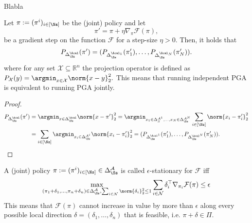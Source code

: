\begin{lemma}\label{lemma:smoothness} 
    Blabla
\end{lemma}

\begin{lemma}\label{claim:projection} Let $\pi := (\pi^i)_{i \in [\Ns]}$ be the (joint) policy and let
\begin{equation}
    \pi' = \pi + \eta \nabla_\pi\mathcal F(\pi),
\end{equation}
be a gradient step on the function $\mathcal F$ for a step-size $\eta>0$. Then, it holds that
\begin{equation}
    P_{\Delta^\Acal_\Ss} (\pi') = (P_{\Delta^{\Acal_1}_\Ss} (\pi'_1) , \dots , P_{\Delta^{\Acal_N}_\Ss}(\pi'_N)).
\end{equation}
where for any set $\mathcal{X}\subseteq \mathbb R^n$ the projection operator is defined as $P_{\mathcal{X}}(y) = \argmin_{x \in\mathcal{X}}  \norm{x-y}_2^2.$ This means that running independent PGA is equivalent to running PGA jointly.
\end{lemma}

\begin{proof}
    \begin{align*}
    P_{\Delta^\Acal_\Ss} (\pi') &= \argmin_{x \in \Delta^\Acal_\Ss}  \norm{x-\pi'}_2^2= \argmin_{x_1 \in \Delta^{\mathcal{A}^1}_S,...,x_N \in 
    \Delta^{\mathcal{A}^N}_\Ss} \sum_{i\in [\Ns]}\norm{x_i - \pi'_i}_2^2\\
    &= \sum_{i \in [\Ns]} \argmin_{x_i \in \Delta^{\mathcal{A}^i}_\Ss} \norm{x_i - \pi'_i}_2^2= (P_{\Delta^{\Acal^1}_\Ss} (\pi'_1) , \dots , P_{\Delta^{\Acal^N}_\Ss}(\pi'_N)).\qedhere
    \end{align*}
\end{proof}

\begin{definition}\label{def:fostationary} 
    A (joint) policy $\pi := (\pi^i)_{i \in [\Ns]} \in \Delta^{\mathcal{A}}_\Ss$ is called $\epsilon$-stationary for $\mathcal F$ iff 
    \begin{equation}     
        \max_{(\pi_1 + \delta_1,\dots,\pi_n+\delta_n) \in \Delta^\mathcal{A}_\Ss,  \sum_{i \in \mathcal{N}}\norm{\delta_i}^2_2 \leq 1 } \sum_{i \in \mathcal{N}} \delta_i^{\top} \nabla_{\pi_i} \mathcal F(\pi) \leq \epsilon 
    \end{equation}
    This means that $\mathcal F(\pi)$ cannot increase in value by more than $\epsilon$ along every possible local direction $\delta=(\delta_1,\dots,\delta_n)$ that is feasible, i.e. $\pi+\delta \in \Pi$.
\end{definition} 

